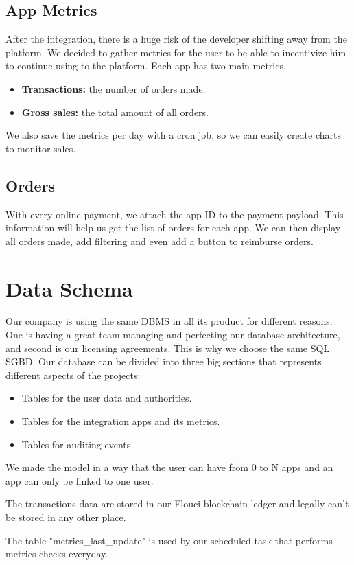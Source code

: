 \begin{spacing}{1.2}
\subsection{App Metrics}
After the integration, there is a huge  risk of the developer shifting away from the platform. We decided to gather metrics for the user to be able to incentivize him to continue using to the platform.
Each app has two main metrics.
\begin{itemize}
	\item \textbf{Transactions:} the number of orders made.
	\item \textbf{Gross sales:} the total amount of all orders.
\end{itemize}
We also save the metrics per day with a cron job, so we can easily create charts to monitor sales.

\subsection{Orders}
With every online payment, we attach the app ID to the payment payload. This information will help us get the list of orders for each app.
We can then display all orders made, add filtering and even add a button to reimburse orders.

\section{Data Schema}
Our company is using the same DBMS in all its product for different reasons. One is having a great team managing and perfecting our database architecture, and second is our licensing agreements. This is why we choose the same SQL SGBD.
Our database can be divided into three big sections that represents different aspects of the projects:
\begin{itemize}
	\item Tables for the user data and authorities.
	\item  Tables for the integration apps and its metrics.
	\item Tables for auditing events.
\end{itemize}

We made the model in a way that the user can have from 0 to N apps and an app can only be linked to one user.

The transactions data are stored in our Flouci blockchain ledger and legally can't be stored in any other place.

The table  "metrics\_last\_update" is used by our scheduled task that performs metrics checks everyday.
 

\end{spacing}
